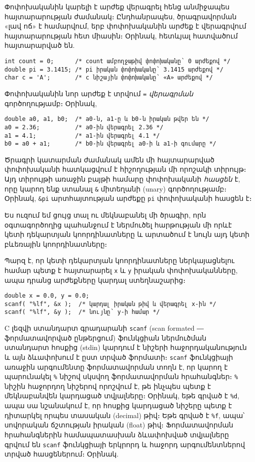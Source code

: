 Փոփոխականին կարելի է արժեք վերագրել հենց անմիջապես հայտարարության
ժամանակ։ Ընդհանրապես, ծրագրավորման «լավ ոճ» է համարվում, երբ փոփոխականին
արժեք է վերագրվում հայտարարության հետ միասին։ Օրինակ, հետևյալ հատվածում
հայտարարված են.

\begin{Verbatim}
int count = 0;      /* count ամբողջաթիվ փոփոխականը՝ 0 արժեքով */
double pi = 3.1415; /* pi իրական փոփոխականը՝ 3.1415 արժեքով */
char c = 'A';       /* c նիշային փոփոխականը՝ «A» արժեքով */
\end{Verbatim}

Փոփոխականին նոր արժեք է տրվում \texttt{=} \emph{վերագրման}
գործողությամբ։ Օրինակ,

\begin{Verbatim}
double a0, a1, b0;  /* a0-ն, a1-ը և b0-ն իրական թվեր են */
a0 = 2.36;          /* a0-ին վերագրել 2.36 */
a1 = 4.1;           /* a1-ին վերագրել 4.1 */
b0 = a0 + a1;       /* b0-ին վերագրել a0-ի և a1-ի գումարը */
\end{Verbatim}

Ծրագրի կատարման ժամանակ ամեն մի հայտարարված փոփոխականի հատկացվում է
հիշողության մի որոշակի տիրույթ։ Այդ տիրույթի առաջին բայթի համարը
փոփոխականի \emph{հասցեն} է, որը կարող ենք ստանալ \texttt{\&} միտեղանի
(unary) գործողությամբ։ Օրինակ, \texttt{\&pi} արտհայտության արժեքը
\texttt{pi} փոփոխականի հասցեն է։

Ես ուզում եմ ցույց տալ ու մեկնաբանել մի ծրագիր, որն օգտագործողից
պահանջում է ներմուծել հարթության մի որևէ կետի դեկարտյան կոորդինատները և
արտածում է նույն այդ կետի բևեռային կոորդինատները։

Պարզ է, որ կետի դեկարտյան կոորդինատները ներկայացնելու համար պետք է
հայտարարել \texttt{x} և \texttt{y} իրական փոփոխականները, ապա դրանց
արժեքները կարդալ ստեղնաշարից։

\begin{Verbatim}
double x = 0.0, y = 0.0;
scanf( "%lf", &x );  /* կարդալ իրական թիվ և վերագրել x-ին */
scanf( "%lf", &y );  /* նույնը՝ y-ի համար */
\end{Verbatim}

C լեզվի ստանդարտ գրադարանի \texttt{scanf} (scan formated ― ֆորմատավորված
ընթերցում) ֆունկցիան ներմուծման ստանդարտ հոսքից (stdin) կարդում է նիշերի
հաջորդականություն և այն ձևափոխում է ըստ տրված ֆորմատի։ \texttt{scanf}
ֆունկցիայի առաջին արգումենտը ֆորմատավորման տողն է, որ կարող է պարունակել
\texttt{\%} նիշով սկսվող ֆորմատավորման հրահանգներ։ \texttt{\%} նիշին
հաջորդող նիշերով որոշվում է, թե ինչպես պետք է մեկնաբանվեն կարդացած
տվյալները։ Օրինակ, եթե գրված է \texttt{\%d}, ապա սա նշանակում է, որ
հոսքից կարդացած նիշերը պետք է դիտարկել որպես տասական (decimal) թիվ։ Եթե
գրված է \texttt{\%f}, ապա՝ սովորական ճշտության իրական (float) թիվ։
Ֆորմատավորման հրահանգներին համապատասխան ձևափոխված տվյալները գրվում են
\texttt{scanf} ֆունկցիայի երկրորդ և հաջորդ արգումենտներով տրված
հասցեներում։ Օրինակ.

